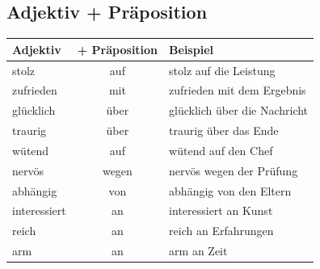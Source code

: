 \subsection{Adjektiv + Präposition}
\begin{center}
\begin{tabular}{|l|c|l|}
\hline
\textbf{Adjektiv} & \textbf{+ Präposition} & \textbf{Beispiel} \\ \hline
stolz & auf & stolz auf die Leistung \\ \hline
zufrieden & mit & zufrieden mit dem Ergebnis \\ \hline
glücklich & über & glücklich über die Nachricht \\ \hline
traurig & über & traurig über das Ende \\ \hline
wütend & auf & wütend auf den Chef \\ \hline
nervös & wegen & nervös wegen der Prüfung \\ \hline
abhängig & von & abhängig von den Eltern \\ \hline
interessiert & an & interessiert an Kunst \\ \hline
reich & an & reich an Erfahrungen \\ \hline
arm & an & arm an Zeit \\ \hline
\end{tabular}
\end{center}

\chapterend